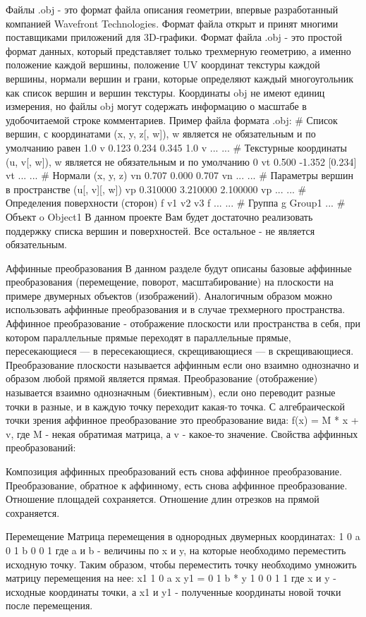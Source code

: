 Файлы .obj - это формат файла описания геометрии, впервые разработанный компанией Wavefront Technologies. Формат файла открыт и принят многими поставщиками приложений для 3D-графики.
Формат файла .obj - это простой формат данных, который представляет только трехмерную геометрию, а именно положение каждой вершины, положение UV координат текстуры каждой вершины, нормали вершин и грани, которые определяют каждый многоугольник как список вершин и вершин текстуры. Координаты obj не имеют единиц измерения, но файлы obj могут содержать информацию о масштабе в удобочитаемой строке комментариев.
Пример файла формата .obj:
  # Список вершин, с координатами (x, y, z[, w]), w является не обязательным и по умолчанию равен 1.0
  v 0.123 0.234 0.345 1.0
  v ...
  ...
  # Текстурные координаты (u, v[, w]), w является не обязательным и по умолчанию 0
  vt 0.500 -1.352 [0.234]
  vt ...
  ...
  # Нормали (x, y, z)
  vn 0.707 0.000 0.707
  vn ...
  ...
  # Параметры вершин в пространстве (u[, v][, w])
  vp 0.310000 3.210000 2.100000
  vp ...
  ...
  # Определения поверхности (сторон)
  f v1 v2 v3
  f ...
  ...
  # Группа
  g Group1
  ...
  # Объект
  o Object1
В данном проекте Вам будет достаточно реализовать поддержку списка вершин и поверхностей. Все остальное - не является обязательным.

Аффинные преобразования
В данном разделе будут описаны базовые аффинные преобразования (перемещение, поворот, масштабирование) на плоскости на примере двумерных объектов (изображений). Аналогичным образом можно использовать аффинные преобразования и в случае трехмерного пространства.
Аффинное преобразование - отображение плоскости или пространства в себя, при котором параллельные прямые переходят в параллельные прямые, пересекающиеся — в пересекающиеся, скрещивающиеся — в скрещивающиеся. 
Преобразование плоскости называется аффинным если оно взаимно однозначно и образом любой прямой является прямая. Преобразование (отображение) называется взаимно однозначным (биективным), если оно переводит разные точки в разные, и в каждую точку переходит какая-то точка.
С алгебраической точки зрения аффинное преобразование это преобразование вида: f(x) = M * x + v, где M - некая обратимая матрица, а v - какое-то значение.
Свойства аффинных преобразований:

Композиция аффинных преобразований есть снова аффинное преобразование.
Преобразование, обратное к аффинному, есть снова аффинное преобразование.
Отношение площадей сохраняется.
Отношение длин отрезков на прямой сохраняется.


Перемещение
Матрица перемещения в однородных двумерных координатах:
1 0 a
0 1 b
0 0 1
где a и b - величины по x и y, на которые необходимо переместить исходную точку. Таким образом, чтобы переместить точку необходимо умножить матрицу перемещения на нее:
x1     1 0 a     x 
y1  =  0 1 b  *  y
1      0 0 1     1
где x и y - исходные координаты точки, а x1 и y1 - полученные координаты новой точки после перемещения.

